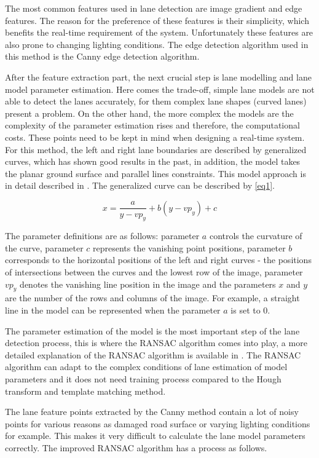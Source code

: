 \documentclass[conference]{IEEEtran}
\begin{document}
The most common features used in lane detection are image gradient and edge features. The reason for the preference of these features is their simplicity, which benefits the real-time requirement of the system. Unfortunately these features are also prone to changing lighting conditions. The edge detection algorithm used in this method is the Canny edge detection algorithm.

After the feature extraction part, the next crucial step is lane modelling and lane model parameter estimation. Here comes the trade-off, simple lane models are not able to detect the lanes accurately, for them complex lane shapes (curved lanes) present a problem. On the other hand, the more complex the models are the complexity of the parameter estimation rises and therefore, the computational costs. These points need to be kept in mind when designing a real-time system. For this method, the left and right lane boundaries are described by generalized curves, which has shown good results in the past, in addition, the model takes the planar ground surface and parallel lines constraints.  This model approach is in detail described in \cite{ransac1}. The generalized curve can be described by \ref{eq1}.

\begin{equation}
x = \frac{a}{y-vp_y}+b(y-vp_y) +c
\label{eq1}
\end{equation}

The parameter definitions are as follows: parameter $a$ controls the curvature of the curve, parameter $c$ represents the vanishing point positions, parameter $b$ corresponds to the horizontal positions of the left and right curves - the positions of intersections between the curves and the lowest row of the image, parameter $vp_y$ denotes the vanishing line position in the image and the parameters $x$ and $y$ are the number of the rows and columns of the image. For example, a straight line in the model can be represented when the parameter $a$ is set to 0. 

The parameter estimation of the model is the most important step of the lane detection process, this is where the RANSAC algorithm comes into play, a more detailed explanation of the RANSAC algorithm is available in \cite{ransac2}. The RANSAC algorithm can adapt to the
complex conditions of lane estimation of model parameters
and it does not need training process compared to the Hough
transform and template matching method.

The lane feature points extracted by the Canny method contain a lot of noisy points for various reasons as damaged road surface or varying lighting conditions for example. This makes it very difficult to calculate the lane model parameters correctly. The improved RANSAC algorithm has a process as follows.
\end{document}
